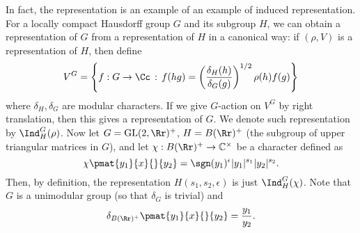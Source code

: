 In fact, the representation is an example of an example of induced representation. 
For a locally compact Hausdorff group $G$ and its subgroup $H$, we can obtain a representation of $G$ from a representation of $H$ in a canonical way: if $(\rho, V)$ is a representation of $H$, then define 
$$
V^{G} = \left\{f:G\to \Cc\,:\, f(hg) = \left( \frac{\delta_{H}(h)}{\delta_{G}(g)}\right)^{1/2}\rho(h)f(g)\right\}
$$
where $\delta_{H}, \delta_{G}$ are modular characters. If we give $G$-action on $V^{G}$ by right translation, then this gives a representation of $G$. We denote such representation by $\Ind_{H}^{G} (\rho)$. 
Now let $G = \GL(2, \Rr)^{+}$, $H = B(\Rr)^{+}$ (the subgroup of upper triangular matrices in $G$), and let $\chi:B(\Rr)^{+}\to \mathbb{C}^{\times}$ be a character defined as 
$$
\chi\pmat{y_{1}}{x}{}{y_{2}} = \sgn(y_{1})^{\epsilon}|y_{1}|^{s_{1}}|y_{2}|^{s_{2}}.
$$
Then, by definition, the representation $H(s_{1}, s_{2}, \epsilon)$ is just $\Ind_{H}^{G}(\chi)$. 
Note that $G$ is a unimodular group (so that $\delta_{G}$ is trivial) and 
$$
\delta_{B(\Rr)^{+}} \pmat{y_{1}}{x}{}{y_{2}} = \frac{y_{1}}{y_{2}}. 
$$

